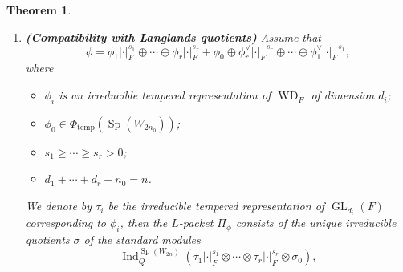 \documentclass[article]{article}
\numberwithin{equation}{section}
\newtheorem{theorem}{Theorem}[section]
\theoremstyle{definition}
\DeclareMathOperator{\End}{End}
\DeclareMathOperator{\WD}{WD}
\DeclareMathOperator{\Ind}{Ind}
\DeclareMathOperator{\GL}{GL}
\DeclareMathOperator{\SP}{Sp}
\DeclareMathOperator{\Irr}{Irr}
\begin{document}
\begin{theorem}
\begin{enumerate}[(1).]
		and $\phi_{\tau}$ is an irreducible tempered representation of $\WD_{F}$ corresponding to $\tau \in \Irr(\GL_{k}(F))$, so there is a natural embedding $\mathcal S_{\phi_{0}}\hookrightarrow \mathcal {S}_{\phi}$. Let $Q$ be a parabolic subgroup of $\SP(W_{2n})$ with Levi subgroup $$M_{Q}\cong \GL_{k}(F) \times \SP(W_{2n_0})$$ and $\sigma_{0}$ be the irreducible tempered representation of $\SP(W_{2n_0})$ corresponding to $(\phi_{0},\eta_0)$ under $\mathcal L$ and $\mathcal J_{\mathfrak W^\prime_{\psi,1}}$. Then the induced representation $\Ind_{Q}^{\SP(W_{2n})}\left(\tau \otimes \sigma_{0}\right)$ has a decomposition 
		$$
		\Ind_{Q}^{\SP(W_{2n})}(\tau \otimes \sigma_{0})=\bigoplus_{\eta}\sigma_{\mathfrak W^\prime_{\psi,1}}(\phi,\eta),
		$$
		where the sum runs over all $\widehat{\bar{ \mathcal S}_{\phi}}$ such that $\eta|_{ \bar{\mathcal S}_{\phi_0}}=\eta_0$. Moreover if $\phi_{\tau}$ is self-dual and of orthogonal type. Let 
		$$
		R_{\mathfrak W^\prime_{\psi,1}}(w, \tau \otimes \sigma_0)
		\in \End_{\SP(W_{2n})}\left(
		\Ind_{Q}^{\SP(W_{2n})}(\tau \otimes \sigma_{0})\right)$$ be the normalized intertwining operator associated to the Whittaker datum $\mathfrak W^\prime_{\psi,1}$ (see section \ref{normalizingintertwing}), where $w$ is the unique non-trivial element in the relative Wely group for $M_Q$. Then
		$$R_{\mathfrak W^\prime_{\psi,1}}(w, \tau \otimes \sigma_0) | _{\sigma}=\mathcal J_{\mathfrak W^\prime_{\psi,1}}(\sigma)(a),$$
		where $a \in \mathcal {S}_{\phi}$ corresponding to $\phi_{\tau}$.
		\item \textbf{(Compatibility with Langlands quotients)}
		Assume that
		$$\phi=\phi_1|\cdot|_{F}^{s_{1}}\oplus \cdots\oplus \phi_{r}|\cdot|_{F}^{s_{r}}+\phi_{0}\oplus \phi_{r}^\vee |\cdot|_{F}^{-s_{r}}\oplus \cdots\oplus \phi_1^\vee|\cdot|_{F}^{-s_{1}},$$ 
		where 
		\begin{itemize}
			\item $\phi_i$ is an irreducible tempered representation of $\WD_F$ of dimension $d_i$; 
			\item $\phi_0\in \Phi_{\mathrm{temp}}(\SP(W_{2n_0}))$;
			\item $s_1\geq \cdots \geq s_r>0$;
			\item $d_1+\cdots +d_r+n_0=n$. 
		\end{itemize}
		We denote by $\tau_{i}$ be the irreducible tempered representation of $\GL_{d_i}(F)$ corresponding to $\phi_i$, then the $L$-packet $\Pi_{\phi}$ consists of the unique irreducible quotients $\sigma$ of the standard modules $$\Ind_{Q}^{\SP(W_{2n})}\left(\tau_{1}|\cdot|_{F}^{s_{1}} \otimes \cdots \otimes \tau_{r}|\cdot|_{F}^{s_{r}} \otimes \sigma_{0}\right),$$

\end{enumerate}
\end{theorem}
\end{document}
